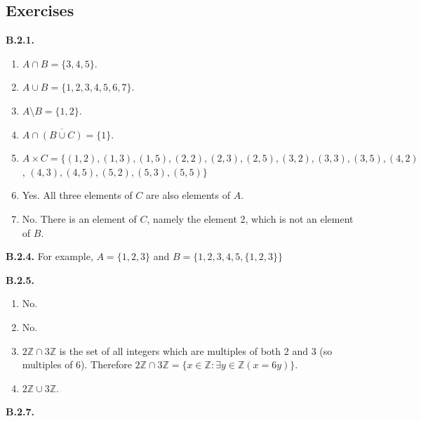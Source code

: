 \documentclass[10pt,]{book}
\theoremstyle{plain}
\theoremstyle{definition}
\theoremstyle{definition}
\theoremstyle{definition}
\theoremstyle{definition}
\numberwithin{equation}{chapter}
\def\Z{\mathbb Z}
\def\st{:}
\def\bar{\overline}
\begin{document}
\subsection*{ Exercises}
\noindent\textbf{B.2.1.} \hypertarget{p-1540}{}%
\leavevmode%
\begin{enumerate}[label=(\alph*)]
\item\hypertarget{li-489}{}\(A \cap B = \{3,4,5\}\).%
\item\hypertarget{li-490}{}\(A \cup B = \{1,2,3,4,5,6,7\}\).%
\item\hypertarget{li-491}{}\(A \setminus B = \{1,2\}\).%
\item\hypertarget{li-492}{}\(A \cap \bar{(B \cup C)} = \{1\}\).%
\item\hypertarget{li-493}{}\(A \times C = \{ (1,2), (1,3), (1,5), (2,2), (2,3), (2,5), (3,2), (3,3), (3,5), (4,2)\), \((4,3), (4,5), (5,2), (5,3), (5,5)\}\)%
\item\hypertarget{li-494}{}\hypertarget{p-1541}{}%
Yes.  All three elements of \(C\) are also elements of \(A\).%
\item\hypertarget{li-495}{}\hypertarget{p-1542}{}%
No. There is an element of \(C\), namely the element 2, which is not an element of \(B\).%
\end{enumerate}
%
\par\smallskip
\noindent\textbf{B.2.4.} \hypertarget{p-1551}{}%
For example, \(A = \{1,2,3\}\) and \(B = \{1,2,3,4,5,\{1,2,3\}\}\)%
\par\smallskip
\noindent\textbf{B.2.5.} \hypertarget{p-1558}{}%
\leavevmode%
\begin{enumerate}[label=(\alph*)]
\item\hypertarget{li-504}{}\hypertarget{p-1559}{}%
No.%
\item\hypertarget{li-505}{}\hypertarget{p-1560}{}%
No.%
\item\hypertarget{li-506}{}\(2\Z \cap 3\Z\) is the set of all integers which are multiples of both 2 and 3 (so multiples of 6). Therefore \(2\Z \cap 3\Z = \{x \in \Z \st \exists y\in \Z(x = 6y)\}\).%
\item\hypertarget{li-507}{}\(2\Z \cup 3\Z\).%
\end{enumerate}
%
\par\smallskip
\noindent\textbf{B.2.7.} \hypertarget{p-1563}{}%
\leavevmode%
\end{document}

